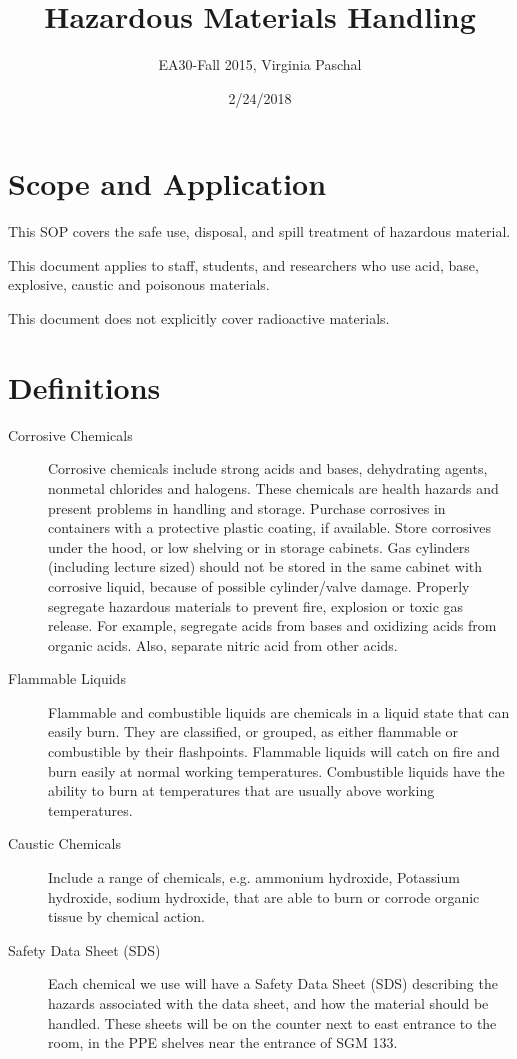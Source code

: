 \documentclass[12pt]{../SOP4_alpha}\usepackage[]{graphicx}\usepackage[]{color}
\title{Hazardous Materials Handling}
\date{2/24/2018}
\author{EA30-Fall 2015, Virginia Paschal}
\begin{document}
\maketitle

\section{Scope and Application}

\NP This SOP covers the safe use, disposal, and spill treatment of hazardous material.

\NP This document applies to staff, students, and researchers who use acid, base, explosive, caustic and poisonous materials.  

\NP This document does not explicitly cover radioactive materials. 

\tableofcontents

\newpage

\section{Definitions}

\begin{description}

  \item[Corrosive Chemicals] Corrosive chemicals include strong acids and bases, dehydrating agents, nonmetal chlorides and halogens. These chemicals are health hazards and present problems in handling and storage. Purchase corrosives in containers with a protective plastic coating, if available.  Store corrosives under the hood, or low shelving or in storage cabinets. Gas cylinders (including lecture sized) should not be stored in the same cabinet with corrosive liquid, because of possible cylinder/valve damage.  Properly segregate hazardous materials to prevent fire, explosion or toxic gas release. For example, segregate acids from bases and oxidizing acids from organic acids. Also, separate nitric acid from other acids. 

\item[Flammable Liquids] Flammable and combustible liquids are chemicals in a liquid state that can easily burn. They are classified, or grouped, as either flammable or combustible by their flashpoints. Flammable liquids will catch on fire and burn easily at normal working temperatures. Combustible liquids have the ability to burn at temperatures that are usually above working temperatures.

\item[Caustic Chemicals] Include a range of chemicals, e.g. ammonium hydroxide, Potassium hydroxide, sodium hydroxide, that are able to burn or corrode organic tissue by chemical action.

\item[Safety Data Sheet (SDS)] Each chemical we use will have a Safety Data Sheet (SDS) describing the hazards associated with the data sheet, and how the material should be handled. These sheets will be on the counter next to east entrance to the room, in the PPE shelves near the entrance of SGM 133.

\end{description}
\end{document}
